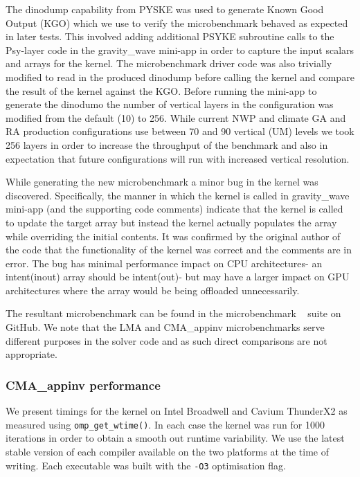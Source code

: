 The dinodump capability from PYSKE was used to generate Known Good Output (KGO) which we use to verify the microbenchmark behaved as expected in later tests.
This involved adding additional PSYKE subroutine calls to the Psy-layer code in the gravity\_wave mini-app in order to capture the input scalars and arrays for the kernel.
The microbenchmark driver code was also trivially modified to read in the produced dinodump before calling the kernel and compare the result of the kernel against the KGO.
Before running the mini-app to generate the dinodumo the number of vertical layers in the configuration was modified from the default (10) to 256.
While current NWP and climate GA and RA production configurations use between 70 and 90 vertical (UM) levels we took 256 layers in order to increase the throughput of the benchmark and also in expectation that future configurations will run with increased vertical resolution.


While generating the new microbenchmark a minor bug in the kernel was discovered.
Specifically, the manner in which the kernel is called in gravity\_wave mini-app (and the supporting code comments) indicate that the kernel is called to update the target array but instead the kernel actually populates the array while overriding the initial contents.
It was confirmed by the original author of the code that the functionality of the kernel was correct and the comments are in error.
The bug has minimal performance impact on CPU architectures- an intent(inout) array should be intent(out)- but may have a larger impact on GPU architectures where the array would be being offloaded unnecessarily. 

The resultant microbenchmark can be found in the microbenchmark ~\cite{lfric-microbenchmarks} suite on GitHub.
We note that the LMA and CMA\_appinv microbenchmarks serve different purposes in the solver code and as such direct comparisons are not appropriate.

\subsubsection{CMA\_appinv performance}

We present timings for the kernel on Intel Broadwell and Cavium ThunderX2 as measured using \verb+omp_get_wtime()+.
In each case the kernel was run for 1000 iterations in order to obtain a smooth out runtime variability.
We use the latest stable version of each compiler available on the two platforms at the time of writing.
Each executable was built with the \verb+-O3+ optimisation flag.

